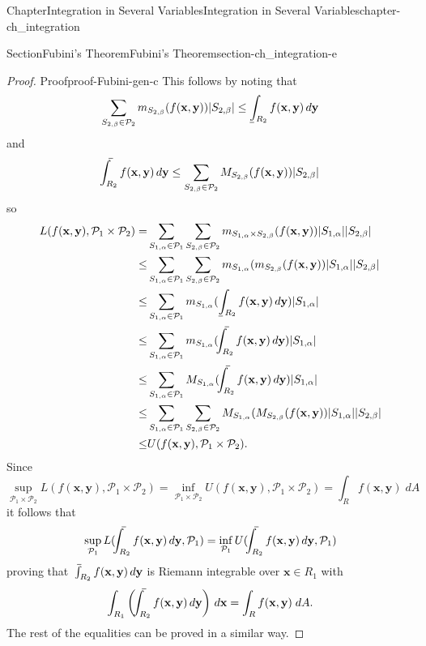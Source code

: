 \documentclass[oneside,10pt,]{book}
\makeatletter
\numberwithin{equation}{section}
\newcommand{\bx}{\mathbf{x}}
\newcommand{\by}{\mathbf{y}}
\newcommand{\cP}{\mathcal{P}}
\def\upint{\mathchoice
    {\mkern10mu\overline{\vphantom{\intop}\mkern7mu}\mkern-24mu}
    {\mkern7mu\overline{\vphantom{\intop}\mkern7mu}\mkern-14mu}
    {\mkern7mu\overline{\vphantom{\intop}\mkern7mu}\mkern-14mu}
    {\mkern7mu\overline{\vphantom{\intop}\mkern7mu}\mkern-14mu}
  \int}
\def\lowint{\relax\if@display
 \mkern3mu\underline{\vphantom{\intop}\mkern7mu}\mkern-10mu\int
\else 
\underline{\vphantom{\int}\mkern7mu}\mkern-10mu\int
\fi}
\newcommand{\amp}{&}
\makeatother
\begin{document}
\begin{chapterptx}{Chapter}{Integration in Several Variables}{}{Integration in Several Variables}{}{}{chapter-ch_integration}
\begin{sectionptx}{Section}{Fubini's Theorem}{}{Fubini's Theorem}{}{}{section-ch_integration-e}
\begin{proof}{Proof}{}{proof-Fubini-gen-c}
This follows by noting that%
\begin{equation*}
\sum_{S_{2,\beta}\in \cP_{2}} m_{S_{2,\beta}}(f(\bx, \by)) |S_{2,\beta}|
\le \lowint_{R_{2}} f(\bx, \by)\, d\by
\end{equation*}
and%
\begin{equation*}
\upint_{R_{2}} f(\bx, \by)\, d\by \le
\sum_{S_{2,\beta}\in \cP_{2}} M_{S_{2,\beta}}(f(\bx, \by)) |S_{2,\beta}|
\end{equation*}
so%
\begin{align*}
L(f(\bx, \by), \cP_{1}\times \cP_{2})=\amp \sum_{S_{1,\alpha}\in \cP_{1}}\sum_{S_{2,\beta}\in \cP_{2}}
m_{S_{1,\alpha}\times S_{2,\beta}}(f(\bx, \by)) |S_{1,\alpha}| |S_{2,\beta}| \\
\le \amp 
\sum_{S_{1,\alpha}\in \cP_{1}}\sum_{S_{2,\beta}\in \cP_{2}} m_{S_{1,\alpha}}(m_{S_{2,\beta}}(f(\bx, \by))
|S_{1,\alpha}| |S_{2,\beta}| \\
\le \amp 
\sum_{S_{1,\alpha}\in \cP_{1}} m_{S_{1,\alpha}} ( \lowint_{R_{2}} f(\bx, \by)\, d\by) |S_{1,\alpha}|\\
\le \amp 
\sum_{S_{1,\alpha}\in \cP_{1}} m_{S_{1,\alpha}} ( \upint_{R_{2}} f(\bx, \by)\, d\by) |S_{1,\alpha}|\\
\le \amp 
\sum_{S_{1,\alpha}\in \cP_{1}} M_{S_{1,\alpha}} ( \upint_{R_{2}} f(\bx, \by)\, d\by) |S_{1,\alpha}|\\
\le \amp 
\sum_{S_{1,\alpha}\in \cP_{1}} \sum_{S_{2,\beta}\in \cP_{2}}
M_{S_{1,\alpha}} ( M_{S_{2,\beta}}(f(\bx, \by))  |S_{1,\alpha}| |S_{2,\beta}|\\
\le \amp U(f(\bx, \by), \cP_{1}\times \cP_{2}).
\end{align*}
Since%
\begin{equation*}
\sup_{\cP_{1}\times \cP_{2} }L(f(\bx, \by), \cP_{1}\times \cP_{2})
=\inf_{\cP_{1}\times \cP_{2} }U(f(\bx, \by), \cP_{1}\times \cP_{2})
= \int_{R} f(\bx, \by)\; dA
\end{equation*}
it follows that%
\begin{equation*}
\sup_{\cP_{1}} L(\upint_{R_{2}} f(\bx, \by)\, d\by, \cP_{1}) =
\inf_{\cP_{1}} U( \upint_{R_{2}} f(\bx, \by)\, d\by, \cP_{1})
\end{equation*}
proving that \(\upint_{R_{2}} f(\bx, \by)\, d\by\) is Riemann integrable over \(\bx \in R_{1}\) with%
\begin{equation*}
\int_{R_{1}} \left(\upint_{R_{2}} f(\bx, \by)\, d\by \right)\, d\bx
= \int_{R} f(\bx, \by)\; dA.
\end{equation*}
The rest of the equalities can be proved in a similar way.\end{proof}

\end{sectionptx}
\end{chapterptx}
\end{document}
